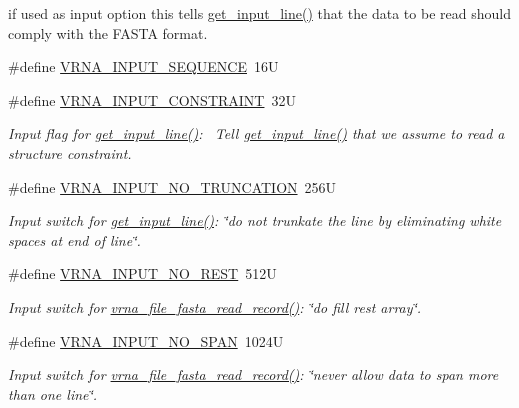 \begin{DoxyCompactItemize}
\begin{DoxyCompactList}
if used as input option this tells \mbox{\hyperlink{group__utils_ga8ef1835eb83f542396f59f0b205965e5}{get\+\_\+input\+\_\+line()}} that the data to be read should comply with the F\+A\+S\+TA format. \end{DoxyCompactList}\item 
\#define \mbox{\hyperlink{group__utils_ga8566d6787972100e68b5a2a159b4cf45}{V\+R\+N\+A\+\_\+\+I\+N\+P\+U\+T\+\_\+\+S\+E\+Q\+U\+E\+N\+CE}}~16U
\item 
\#define \mbox{\hyperlink{group__utils_gac08a9df45b9721b97a47dbfe7a6e5f85}{V\+R\+N\+A\+\_\+\+I\+N\+P\+U\+T\+\_\+\+C\+O\+N\+S\+T\+R\+A\+I\+NT}}~32U
\begin{DoxyCompactList}\small\item\em Input flag for \mbox{\hyperlink{group__utils_ga8ef1835eb83f542396f59f0b205965e5}{get\+\_\+input\+\_\+line()}}\+:~\newline
Tell \mbox{\hyperlink{group__utils_ga8ef1835eb83f542396f59f0b205965e5}{get\+\_\+input\+\_\+line()}} that we assume to read a structure constraint. \end{DoxyCompactList}\item 
\#define \mbox{\hyperlink{group__utils_ga086742158293217a46ae2f71bb296937}{V\+R\+N\+A\+\_\+\+I\+N\+P\+U\+T\+\_\+\+N\+O\+\_\+\+T\+R\+U\+N\+C\+A\+T\+I\+ON}}~256U
\begin{DoxyCompactList}\small\item\em Input switch for \mbox{\hyperlink{group__utils_ga8ef1835eb83f542396f59f0b205965e5}{get\+\_\+input\+\_\+line()}}\+: {\itshape \char`\"{}do not trunkate the line by eliminating white spaces at end of line\char`\"{}}. \end{DoxyCompactList}\item 
\#define \mbox{\hyperlink{group__utils_ga7a2e8c50a0c7ce82e60da1016e1367fd}{V\+R\+N\+A\+\_\+\+I\+N\+P\+U\+T\+\_\+\+N\+O\+\_\+\+R\+E\+ST}}~512U
\begin{DoxyCompactList}\small\item\em Input switch for \mbox{\hyperlink{group__file__utils_ga8cfb7e271efc9e1f34640acb85475639}{vrna\+\_\+file\+\_\+fasta\+\_\+read\+\_\+record()}}\+: {\itshape \char`\"{}do fill rest array\char`\"{}}. \end{DoxyCompactList}\item 
\#define \mbox{\hyperlink{group__utils_ga0de536599b881c787b0943a2671da476}{V\+R\+N\+A\+\_\+\+I\+N\+P\+U\+T\+\_\+\+N\+O\+\_\+\+S\+P\+AN}}~1024U
\begin{DoxyCompactList}\small\item\em Input switch for \mbox{\hyperlink{group__file__utils_ga8cfb7e271efc9e1f34640acb85475639}{vrna\+\_\+file\+\_\+fasta\+\_\+read\+\_\+record()}}\+: {\itshape \char`\"{}never allow data to span more than one line\char`\"{}}. \end{DoxyCompactList}\item 

\end{DoxyCompactItemize}
